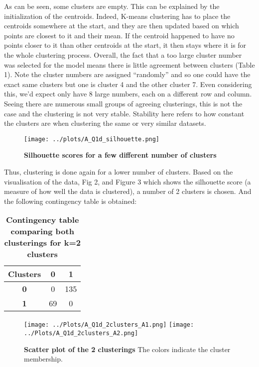 \documentclass[12pt]{report} %
\begin{document}
As can be seen, some clusters are empty. This can be explained by the initialization of the centroids. Indeed, K-means clustering has to place the centroids somewhere at the start, and they are then updated based on which points are closest to it and their mean. If the centroid happened to have no points closer to it than other centroids at the start, it then stays where it is for the whole clustering process\cite{kmeans_sklearn}. Overall, the fact that a too large cluster number was selected for the model means there is little agreement between clusters (Table 1). Note the cluster numbers are assigned ``randomly'' and so one could have the exact same clusters but one is cluster 4 and the other cluster 7. Even considering this, we'd expect only have 8 large numbers, each on a different row and column. Seeing there are numerous small groups of agreeing clusterings, this is not the case and the clustering is not very stable. Stability here refers to how constant the clusters are when clustering the same or very similar datasets. 

\begin{figure}[htbp]
    \centering
    \texttt{[image: ../plots/A\_Q1d\_silhouette.png]}
    \caption{\textbf{Silhouette scores for a few different number of clusters}}
\end{figure}

Thus, clustering is done again for a lower number of clusters. Based on the visualisation of the data, Fig 2, and Figure 3 which shows the silhouette score (a measure of how well the data is clustered)\cite[pp. 247-250]{sklearn_book}, a number of 2 clusters is chosen. And the following contingency table is obtained:

\begin{table}[h]
    \centering
    \begin{tabular}{ |c|c|c| }
        \hline
        \textbf{Clusters} & \textbf{0} & \textbf{1}\\ 
        \hline
        \textbf{0} & 0 & 135\\
        \hline
        \textbf{1} & 69 & 0 \\
        \hline
    \end{tabular}
    \caption{\textbf{Contingency table comparing both clusterings for k=2 clusters}}
    \end{table}


\begin{figure}[htbp]
    \centering
    \texttt{[image: ../Plots/A\_Q1d\_2clusters\_A1.png]}
    \texttt{[image: ../Plots/A\_Q1d\_2clusters\_A2.png]}
    \caption{\textbf{Scatter plot of the 2 clusterings} The colors indicate the cluster membership.}
\end{figure}
\end{document}

